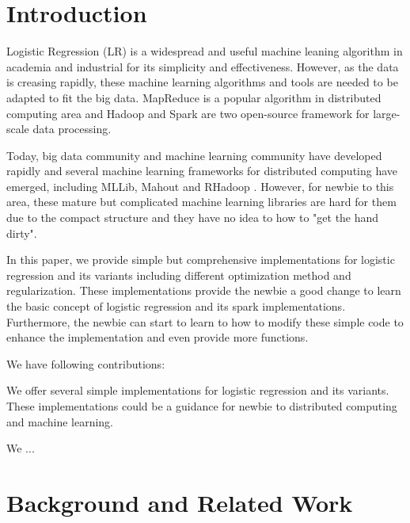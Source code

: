 \documentclass[sigconf]{acmart}
\begin{document}
\section{Introduction}
\label{sec:introduction}

Logistic Regression (LR) is a widespread and useful machine leaning algorithm in academia and industrial for its simplicity and effectiveness. However, as the data is creasing rapidly, these machine learning algorithms and tools are needed to be adapted to fit the big data. MapReduce \cite{dean2008mapreduce} is a popular algorithm in distributed computing area and Hadoop \cite{shvachko2010hadoop} and Spark \cite{zaharia2010spark} are two open-source framework for large-scale data processing. 

Today, big data community and machine learning community have developed rapidly and several machine learning frameworks for distributed computing have emerged, including MLLib, Mahout and RHadoop \cite{witten2016data}. However, for newbie to this area, these mature but complicated machine learning libraries are hard for them due to the compact structure and they have no idea to how to "get the hand dirty". 

In this paper, we provide simple but comprehensive implementations for logistic regression and its variants including different optimization method and regularization. These implementations provide the newbie a good change to learn the basic concept of logistic regression and its spark implementations. Furthermore, the newbie can start to learn to how to modify these simple code to enhance the implementation and even provide more functions. 

We have following contributions:

We offer several simple implementations for logistic regression and its variants. These implementations could be a guidance for newbie to distributed computing and machine learning. 

We ...



\section{Background and Related Work}
\label{sec:relatedWork}
\end{document}
